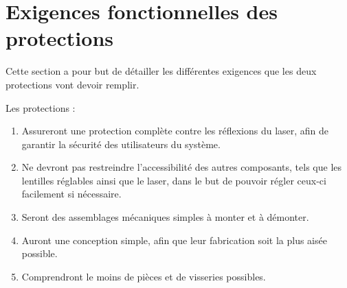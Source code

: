 \section{Exigences fonctionnelles des protections}
Cette section a pour but de détailler les différentes exigences que les deux protections vont devoir remplir.

Les protections :
\begin{enumerate}
    \item Assureront une protection complète contre les réflexions du laser, afin de garantir la sécurité des utilisateurs du système.
    \item Ne devront pas restreindre l'accessibilité des autres composants, tels que les lentilles réglables ainsi que le laser, dans le but de pouvoir régler ceux-ci facilement si nécessaire.
    \item Seront des assemblages mécaniques simples à monter et à démonter.
    \item Auront une conception simple, afin que leur fabrication soit la plus aisée possible.
    \item Comprendront le moins de pièces et de visseries possibles.
\end{enumerate}
\clearpage

